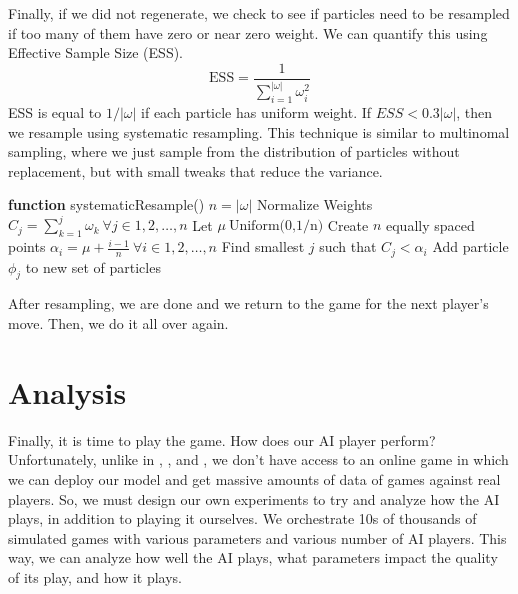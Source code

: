 \documentclass{article}
\begin{document}
Finally, if we did not regenerate, we check to see if particles need to be resampled if too many of them have zero or near zero weight. We can quantify this using Effective Sample Size (ESS).
$$\text{ESS} = \frac{1}{\sum_{i=1}^{|\omega|}\omega_i^2}$$
ESS is equal to $1/|\omega|$ if each particle has uniform weight. If $ESS < 0.3|\omega|$, then we resample using systematic resampling. This technique is similar to multinomal sampling, where we just sample from the distribution of particles without replacement, but with small tweaks that reduce the variance.
\begin{algorithm}[H]
    \caption{Systematic Resampling}
    \label{alg:sysResampling}
    \begin{algorithmic}[1]
        \State \textbf{function} systematicResample()
        \State $n = |\omega|$
        \State Normalize Weights
        \State $C_j = \sum_{k=1}^j \omega_k \ \forall j \in {1, 2, \dots, n}$
        \State Let $\mu ~ \text{Uniform(0,1/n)}$
        \State Create $n$ equally spaced points $\alpha_i = \mu + \frac{i-1}{n} \ \forall i \in {1, 2, \dots, n}$
        \State Find smallest $j$ such that $C_j < \alpha_i$
        \State Add particle $\phi_j$ to new set of particles
        \EndFor
    \end{algorithmic}
\end{algorithm}

After resampling, we are done and we return to the game for the next player's move. Then, we do it all over again.

\section{Analysis}
\label{section:Analysis}
Finally, it is time to play the game. How does our AI player perform? Unfortunately, unlike in \citep{Cowling2013}, \citep{rebstock2019policy}, and \citep{cohensius2019bidding}, we don't have access to an online game in which we can deploy our model and get massive amounts of data of games against real players.
So, we must design our own experiments to try and analyze how the AI plays, in addition to playing it ourselves. We orchestrate 10s of thousands of simulated games with various parameters and various number of AI players. This way, we can analyze how well the AI plays, what parameters impact the quality of its play, and how it plays.
\end{document}
